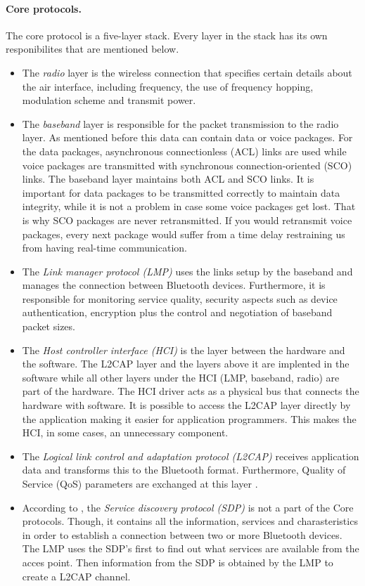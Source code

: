 \documentclass[a4paper, 11pt]{report}
\begin{document}
		\paragraph{Core protocols.}
The core protocol is a five-layer stack. Every layer in the stack has its own responibilites that are mentioned below.

		\begin{itemize}
			\item The \textit{radio} layer is the wireless connection that specifies certain details about the air interface, including frequency, the use of frequency hopping, modulation scheme and transmit power. 
			\item The \textit{baseband} layer is responsible for the packet transmission to the radio layer. As mentioned before this data can contain data or voice packages. For the data packages, asynchronous connectionless (ACL) links are used while voice packages are transmitted with synchronous connection-oriented (SCO) links. The baseband layer maintains both ACL and SCO links. It is important for data packages to be transmitted correctly to maintain data integrity, while it is not a problem in case some voice packages get lost. That is why SCO packages are never retransmitted. If you would retransmit voice packages, every next package would suffer from a time delay restraining us from having real-time communication.
			\item The \textit{Link manager protocol (LMP)} uses the links setup by the baseband and manages the connection between Bluetooth devices. Furthermore, it is responsible for monitoring service quality, security aspects such as device authentication, encryption plus the control and negotiation of baseband packet sizes.
			\item The \textit{Host controller interface (HCI)} is the layer between the hardware and the software. The L2CAP layer and the layers above it are implented in the software while all other layers under the HCI (LMP, baseband, radio) are part of the hardware. The HCI driver acts as a physical bus that connects the hardware with software. It is possible to access the L2CAP layer directly by the application making it easier for application programmers. This makes the HCI, in some cases, an unnecessary component.
			\item The \textit{Logical link control and adaptation protocol (L2CAP)} receives application data and transforms this to the Bluetooth format. Furthermore, Quality of Service (QoS) parameters are exchanged at this layer \cite{bluetoothStack}.
			\item According to \cite{bluetoothStack}, the \textit{Service discovery protocol (SDP)} is not a part of the Core protocols. Though, it contains all the information, services and charasteristics  in order to establish a connection between two or more Bluetooth devices. The LMP uses the SDP's first to find out what services are available from the acces point. Then information from the SDP is obtained by the LMP to create a L2CAP channel.
		\end{itemize}
		
\end{document}
